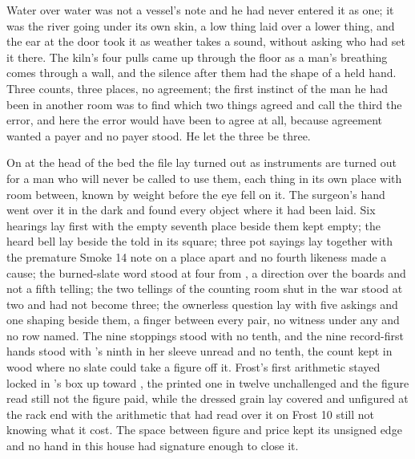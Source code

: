 Water over water was not a vessel's note and he had never entered it as one; it was the river going under its own skin, a low thing laid over a lower thing, and the ear at the door took it as weather takes a sound, without asking who had set it there. The kiln's four pulls came up through the floor as a man's breathing comes through a wall, and the silence after them had the shape of a held hand. Three counts, three places, no agreement; the first instinct of the man he had been in another room was to find which two things agreed and call the third the error, and here the error would have been to agree at all, because agreement wanted a payer and no payer stood. He let the three be three.

\scenebreak

On  at the head of the bed the file lay turned out as instruments are turned out for a man who will never be called to use them, each thing in its own place with room between, known by weight before the eye fell on it. The surgeon's hand went over it in the dark and found every object where it had been laid. Six hearings lay first with the empty seventh place beside them kept empty; the heard bell lay beside the told in its square; three pot sayings lay together with the premature Smoke 14 note on a place apart and no fourth likeness made a cause; the burned-slate word stood at four from , a direction over the boards and not a fifth telling; the two tellings of the counting room shut in the war stood at two and had not become three; the ownerless question lay with five askings and one shaping beside them, a finger between every pair, no witness under any and no row named. The nine stoppings stood with no tenth, and the nine record-first hands stood with 's ninth in her sleeve unread and no tenth, the count kept in wood where no slate could take a figure off it. Frost's first arithmetic stayed locked in 's box up  toward , the printed one in twelve unchallenged and the figure read still not the figure paid, while the dressed grain lay covered and unfigured at the rack end with the arithmetic that had read over it on Frost 10 still not knowing what it cost. The space between figure and price kept its unsigned edge and no hand in this house had signature enough to close it.

